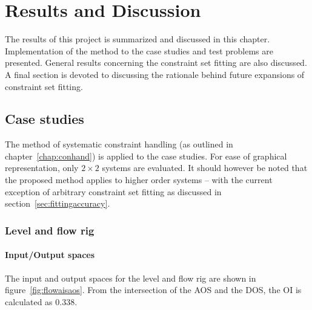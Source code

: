\chapter{Results and Discussion}\label{chap:results}
\begin{overview}
  The results of this project is summarized and discussed in this chapter.
  Implementation of the method to the case studies and test problems are presented.
  General results concerning the constraint set fitting are also discussed.
  A final section is devoted to discussing the rationale behind future expansions of constraint set fitting.
\end{overview}

\section{Case studies}
The method of systematic constraint handling (as outlined in chapter~\ref{chap:conhand}) is applied to the case studies.
For ease of graphical representation, only $2\times2$ systems are evaluated.
It should however be noted that the proposed method applies to higher order systems -- with the current exception of arbitrary constraint set fitting as discussed in section~\ref{sec:fittingaccuracy}.
\subsection{Level and flow rig}
\subsubsection{Input/Output spaces}
The input and output spaces for the level and flow rig are shown in figure~\ref{fig:flowaisaos}.
From the intersection of the AOS and the DOS, the OI is calculated as 0.338.

